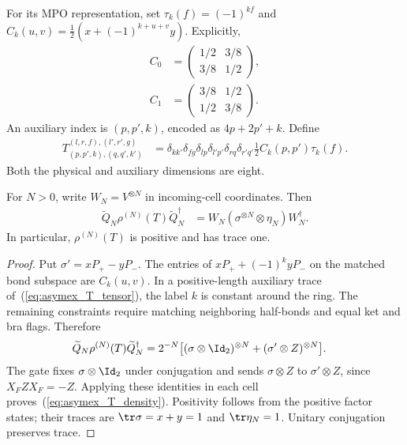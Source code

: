 For its MPO representation, set $\tau_k(f)=(-1)^{kf}$ and
$C_k(u,v)=\tfrac12(x+(-1)^{k+u+v}y)$. Explicitly,
\begin{align}
    C_0 & =\begin{pmatrix}1/2&3/8\\3/8&1/2\end{pmatrix}, \nonumber \\
    C_1 & =\begin{pmatrix}3/8&1/2\\1/2&3/8\end{pmatrix}.
    \label{eq:asymex_dimer_C}
\end{align}
An auxiliary index is $(p,p',k)$, encoded as $4p+2p'+k$. Define
\begin{align}
    T^{(l,r,f),(l',r',g)}_{(p,p',k),(q,q',k')}
     & =\delta_{kk'}\delta_{fg}\delta_{lp}\delta_{l'p'}
    \delta_{rq}\delta_{r'q'} \frac12C_k(p,p')\tau_k(f).
    \label{eq:asymex_T_tensor}
\end{align}
Both the physical and auxiliary dimensions are eight.

\begin{lemma}
    \label{thm:asymex_T_density}
    \leanok
    For $N>0$, write $W_N=V^{\otimes N}$ in incoming-cell coordinates.
    Then
    \begin{align}
        \widetilde Q_N\rho^{(N)}(T)\widetilde Q_N^\dagger
         & =W_N(\sigma^{\otimes N}\otimes\eta_N)W_N^\dagger.
        \label{eq:asymex_T_density}
    \end{align}
    In particular, $\rho^{(N)}(T)$ is positive and has trace one.
\end{lemma}
\begin{proof}
    \leanok
    Put $\sigma'=xP_+-yP_-$. The entries of
    $xP_++(-1)^kyP_-$ on the matched bond subspace are $C_k(u,v)$.
    In a positive-length auxiliary trace of~(\ref{eq:asymex_T_tensor}),
    the label $k$ is constant around the ring. The remaining constraints
    require matching neighboring half-bonds and equal ket and bra flags.
    Therefore
    \begin{align}
        \widetilde Q_N\rho^{(N)}(T)\widetilde Q_N^\dagger
         & =2^{-N}\bigl[(\sigma\otimes\Id_2)^{\otimes N}
            +(\sigma'\otimes Z)^{\otimes N}\bigr].
        \label{eq:asymex_T_contraction}
    \end{align}
    The gate fixes $\sigma\otimes\Id_2$ under conjugation and sends
    $\sigma\otimes Z$ to $\sigma'\otimes Z$, since $X_FZX_F=-Z$.
    Applying these identities in each cell proves~(\ref{eq:asymex_T_density}).
    Positivity follows from the positive factor states; their traces are
    $\tr\sigma=x+y=1$ and $\tr\eta_N=1$. Unitary conjugation preserves trace.
\end{proof}

